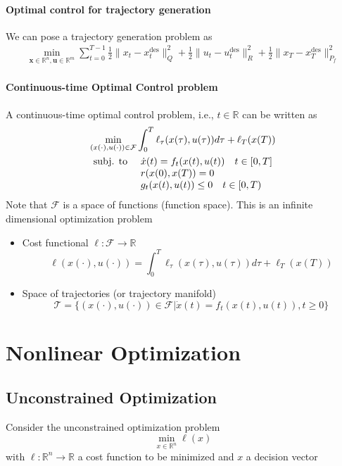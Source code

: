 \documentclass{book}
\DeclareMathOperator{\des}{des}
\newcommand{\R}{\mathbb{R}}
\theoremstyle{definition}
\theoremstyle{remark}
\theoremstyle{remark}
\begin{document}
\subsubsection{Optimal control for trajectory generation}
We can pose a trajectory generation problem as 
\begin{gather*}
    \min_{\mathbf{x}\in\R^n,\mathbf{u}\in\R^m}\displaystyle\sum_{t=0}^{T-1}\displaystyle\frac{1}{2}\|x_t-x_t^{\des}\|^2_Q + \displaystyle\frac{1}{2}\|u_t-u_t^{\des}\|^2_R + \displaystyle\frac{1}{2}\|x_T-x_T^{\des}\|^2_{P_f}
\end{gather*}

\subsubsection{Continuous-time Optimal Control problem}
A continuous-time optimal control problem, i.e., $t\in\R$ can be written as 
\begin{gather*}
    \min_{(x(\cdot),u(\cdot))\in \mathcal{F}}\displaystyle\int_{0}^{T}\ell_\tau(x(\tau),u(\tau))d\tau+\ell_T(x(T))\\
    \begin{array}{l l}
        \text{subj. to } & \dot{x}(t) = f_t(x(t),u(t)) \quad t\in[0,T]\\
                         & r(x(0),x(T)) = 0 \\
                         & g_t(x(t),u(t))\leq 0 \quad t\in[0,T)
    \end{array}
\end{gather*}
Note that $\mathcal{F}$ is a space of functions (function space). This is an infinite dimensional optimization problem
\begin{itemize}
    \item Cost functional $\ell:\mathcal{F}\to\R$
        \[
            \ell(x(\cdot),u(\cdot)) = \displaystyle\int_{0}^{T}\ell_\tau(x(\tau),u(\tau))d\tau+\ell_T(x(T))
        \]
    \item Space of trajectories (or trajectory manifold)
        \[
            \mathcal{T} = \{(x(\cdot),u(\cdot))\in\mathcal{F}|\dot{x}(t)=f_t(x(t),u(t)), t\geq 0\}
        \]
\end{itemize}

\chapter{Nonlinear Optimization}
\section{Unconstrained Optimization}
Consider the unconstrained optimization problem 
\[
    \min_{x\in\R^n}\ell(x)
\]
with $\ell:\R^n\to\R$ a cost function to be minimized and $x$ a decision vector 
\end{document}
